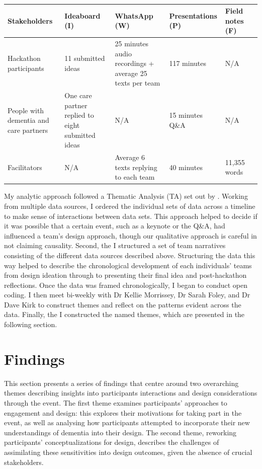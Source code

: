 \begin{table}[ht]
\caption{}
\label{table:data collection}
\begin{tabularx}{\textwidth}{@{} Y|YYYYY @{}}
\textbf{Stakeholders} & \textbf{Ideaboard (I)} & \textbf{WhatsApp (W)} & \textbf{Presentations (P)} & \textbf{Field notes (F)} \\ \hline
Hackathon participants & 11 submitted ideas & 25 minutes audio recordings + average 25 texts per team & 117 minutes & N/A \\
People with dementia and care partners & One care partner replied to eight submitted ideas & N/A & 15 minutes Q\&A & N/A \\
Facilitators & N/A & Average 6 texts replying to each team & 40 minutes & 11,355 words \\
\end{tabularx}
\end{table}
My analytic approach followed a Thematic Analysis (TA) set out by \cite{braun_one_2020,braun_using_2006}. Working from multiple data sources, I ordered the individual sets of data across a timeline to make sense of interactions between data sets. This approach helped to decide if it was possible that a certain event, such as a keynote or the Q\&A, had influenced a team's design approach, though our qualitative approach is careful in not claiming causality. Second, the I structured a set of team narratives consisting of the different data sources described above. Structuring the data this way helped to describe the chronological development of each individuals’ teams from design ideation through to presenting their final idea and post-hackathon reflections.  Once the data was framed chronologically, I began to conduct open coding. I then meet bi-weekly with Dr Kellie Morrissey, Dr Sarah Foley, and Dr Dave Kirk to construct themes and reflect on the patterns evident across the data. Finally, the I constructed the named themes, which are presented in the following section. 

\section{Findings}
\label{sec:Findings}
This section presents a series of findings that centre around two overarching themes describing insights into participants interactions and design considerations through the event. The first theme examines participants' approaches to engagement and design: this explores their motivations for taking part in the event, as well as analysing how participants attempted to incorporate their new understandings of dementia into their design. The second theme, reworking participants’ conceptualizations for design, describes the challenges of assimilating these sensitivities into design outcomes, given the absence of crucial stakeholders.

